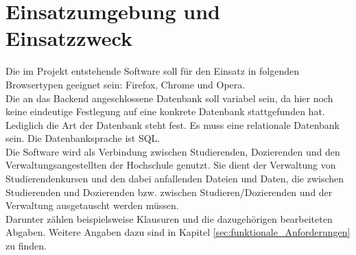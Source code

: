 
\chapter{Einsatzumgebung und Einsatzzweck}
Die im Projekt entstehende Software soll für den Einsatz in folgenden Browsertypen geeignet sein: Firefox, Chrome und Opera. \\
Die an das Backend angeschlossene Datenbank soll variabel sein, da hier noch keine eindeutige Festlegung auf eine konkrete Datenbank stattgefunden hat. Lediglich die Art der Datenbank steht fest. Es muss eine relationale Datenbank sein. Die Datenbanksprache ist SQL.\\

Die Software wird als Verbindung zwischen Studierenden, Dozierenden und den Verwaltungsangestellten der Hochschule genutzt. Sie dient der Verwaltung von Studierendenkursen und den dabei anfallenden Dateien und Daten, die zwischen Studierenden und Dozierenden bzw. zwischen Studieren/Dozierenden und der Verwaltung ausgetauscht werden müssen. \\
Darunter zählen beispielsweise Klausuren und die dazugehörigen bearbeiteten Abgaben. Weitere Angaben dazu sind in Kapitel \ref{sec:funktionale_Anforderungen} zu finden. 
